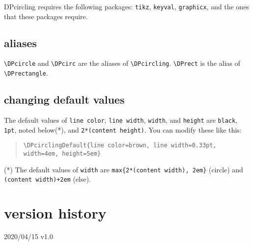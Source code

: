 \documentclass[10pt]{article}
\begin{document}
DPcircling requires the following packages: \verb+tikz+, \verb+keyval+, \verb+graphicx+, and the ones that these packages require.

\subsection*{aliases}

\verb+\DPcircle+ and \verb+\DPcirc+ are the aliases of \verb+\DPcircling+.
\verb+\DPrect+ is the alias of \verb+\DPrectangle+.

\subsection*{changing default values}

The default values of \verb+line color+, \verb+line width+, \verb+width+, and \verb+height+ are \verb+black+, \verb+1pt+, noted below(*), and \verb+2*(content height)+. You can modify these like this:
\begin{quote}
\begin{verbatim}
\DPcirclingDefault{line color=brown, line width=0.33pt, width=4em, height=5em}
\end{verbatim}
\end{quote}

\noindent (*) The default values of \verb+width+ are \verb+max{2*(content width), 2em}+ (circle) and 
\verb:(content width)+2em: (else).

\section*{version history}

2020/04/15 v1.0
\end{document}
